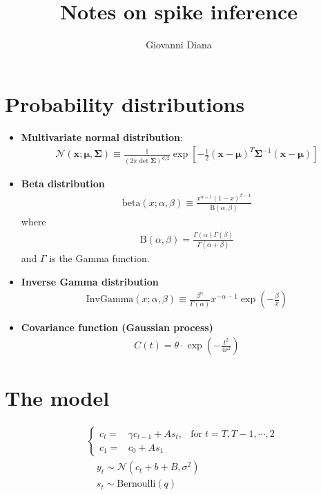 \documentclass{article}
\author{Giovanni Diana}
\title{Notes on spike inference}
\theoremstyle{remark}
\begin{document}
\maketitle
\section{Probability distributions}
\begin{itemize}
    \item {\bf Multivariate normal distribution}:
        \begin{align}
            \mathcal{N}(\bm{x};\bm\mu,\bm\Sigma)\equiv \frac{1}{(2\pi\det\bm\Sigma)^{d/2}}\exp\left[-\frac{1}{2}(\bm x-\bm\mu)^T\bm\Sigma^{-1}(\bm x-\bm\mu)\right]
        \end{align}
    \item {\bf Beta distribution}
        \begin{align}
            \mathrm{beta}(x;\alpha,\beta)\equiv \frac{x^{\alpha-1}(1-x)^{\beta-1}}{\mathrm{B}(\alpha,\beta)}
        \end{align}
        where 
        \begin{align}
            \mathrm{B}(\alpha,\beta)=\frac{\Gamma(\alpha)\Gamma(\beta)}{\Gamma(\alpha+\beta)}
        \end{align}
        and $\Gamma$ is the Gamma function.
    \item {\bf Inverse Gamma distribution}
        \begin{align}
            \mathrm{InvGamma}(x;\alpha,\beta)\equiv \frac{\beta^\alpha}{\Gamma(\alpha)} x^{-\alpha-1}\exp\left(-\frac{\beta}{x}\right)
        \end{align}
    \item {\bf Covariance function (Gaussian process)}
        \begin{align}
            C(t) = \theta\cdot\exp\left(-\frac{t^2}{4r^2}\right)
        \end{align}
\end{itemize}
\section{The model}
\begin{align}
    &\left\lbrace\begin{array}{clc} 
        c_t =& \gamma c_{t-1} + A s_t,& \mathrm{for}\; t=T,T-1,\cdots,2\\
        c_1 =& c_0 + A s_1 &
    \end{array}\right.\\
    &\quad y_t \sim \mathcal{N}(c_t+b+B,\sigma^2)\\
    &\quad s_t \sim \mathrm{Bernoulli}(q)
\end{align}
\end{document}
